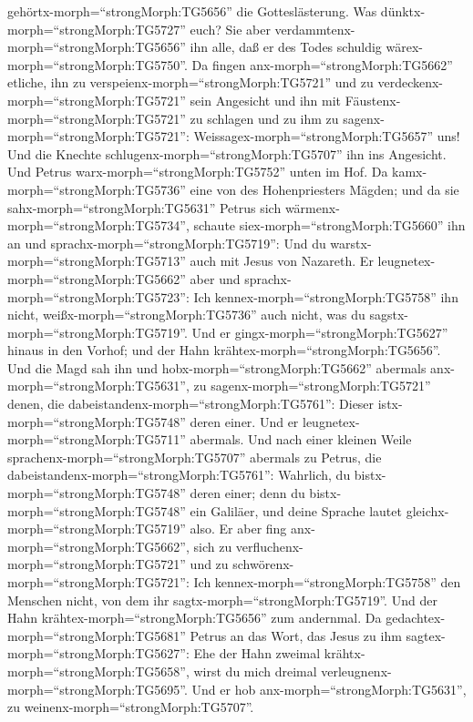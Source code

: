 gehörtx-morph=``strongMorph:TG5656'' die Gotteslästerung. Was
dünktx-morph=``strongMorph:TG5727'' euch? Sie aber
verdammtenx-morph=``strongMorph:TG5656'' ihn alle, daß er des Todes
schuldig wärex-morph=``strongMorph:TG5750''.  Da fingen
anx-morph=``strongMorph:TG5662'' etliche, ihn zu
verspeienx-morph=``strongMorph:TG5721'' und zu
verdeckenx-morph=``strongMorph:TG5721'' sein Angesicht und ihn mit
Fäustenx-morph=``strongMorph:TG5721'' zu schlagen und zu ihm zu
sagenx-morph=``strongMorph:TG5721'':
Weissagex-morph=``strongMorph:TG5657'' uns! Und die Knechte
schlugenx-morph=``strongMorph:TG5707'' ihn ins Angesicht. 
Und Petrus warx-morph=``strongMorph:TG5752'' unten im Hof. Da
kamx-morph=``strongMorph:TG5736'' eine von des Hohenpriesters Mägden;
 und da sie sahx-morph=``strongMorph:TG5631'' Petrus sich
wärmenx-morph=``strongMorph:TG5734'', schaute
siex-morph=``strongMorph:TG5660'' ihn an und
sprachx-morph=``strongMorph:TG5719'': Und du
warstx-morph=``strongMorph:TG5713'' auch mit Jesus von Nazareth.
 Er leugnetex-morph=``strongMorph:TG5662'' aber und
sprachx-morph=``strongMorph:TG5723'': Ich
kennex-morph=``strongMorph:TG5758'' ihn nicht,
weißx-morph=``strongMorph:TG5736'' auch nicht, was du
sagstx-morph=``strongMorph:TG5719''. Und er
gingx-morph=``strongMorph:TG5627'' hinaus in den Vorhof; und der Hahn
krähtex-morph=``strongMorph:TG5656''.  Und die Magd sah ihn
und hobx-morph=``strongMorph:TG5662'' abermals
anx-morph=``strongMorph:TG5631'', zu sagenx-morph=``strongMorph:TG5721''
denen, die dabeistandenx-morph=``strongMorph:TG5761'': Dieser
istx-morph=``strongMorph:TG5748'' deren einer.  Und er
leugnetex-morph=``strongMorph:TG5711'' abermals. Und nach einer kleinen
Weile sprachenx-morph=``strongMorph:TG5707'' abermals zu Petrus, die
dabeistandenx-morph=``strongMorph:TG5761'': Wahrlich, du
bistx-morph=``strongMorph:TG5748'' deren einer; denn du
bistx-morph=``strongMorph:TG5748'' ein Galiläer, und deine Sprache
lautet gleichx-morph=``strongMorph:TG5719'' also.  Er aber
fing anx-morph=``strongMorph:TG5662'', sich zu
verfluchenx-morph=``strongMorph:TG5721'' und zu
schwörenx-morph=``strongMorph:TG5721'': Ich
kennex-morph=``strongMorph:TG5758'' den Menschen nicht, von dem ihr
sagtx-morph=``strongMorph:TG5719''.  Und der Hahn
krähtex-morph=``strongMorph:TG5656'' zum andernmal. Da
gedachtex-morph=``strongMorph:TG5681'' Petrus an das Wort, das Jesus zu
ihm sagtex-morph=``strongMorph:TG5627'': Ehe der Hahn zweimal
krähtx-morph=``strongMorph:TG5658'', wirst du mich dreimal
verleugnenx-morph=``strongMorph:TG5695''. Und er hob
anx-morph=``strongMorph:TG5631'', zu
weinenx-morph=``strongMorph:TG5707''.

